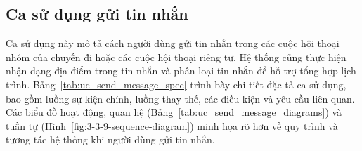 \subsection{Ca sử dụng gửi tin nhắn}
\noindent Ca sử dụng này mô tả cách người dùng gửi tin nhắn trong các cuộc hội thoại nhóm của chuyến đi hoặc các cuộc hội thoại riêng tư. Hệ thống cũng thực hiện nhận dạng địa điểm trong tin nhắn và phân loại tin nhắn để hỗ trợ tổng hợp lịch trình. Bảng~\ref{tab:uc_send_message_spec} trình bày chi tiết đặc tả ca sử dụng, bao gồm luồng sự kiện chính, luồng thay thế, các điều kiện và yêu cầu liên quan. Các biểu đồ hoạt động, quan hệ (Bảng~\ref{tab:uc_send_message_diagrams}) và tuần tự (Hình~\ref{fig:3-3-9-sequence-diagram}) minh họa rõ hơn về quy trình và tương tác hệ thống khi người dùng gửi tin nhắn.

